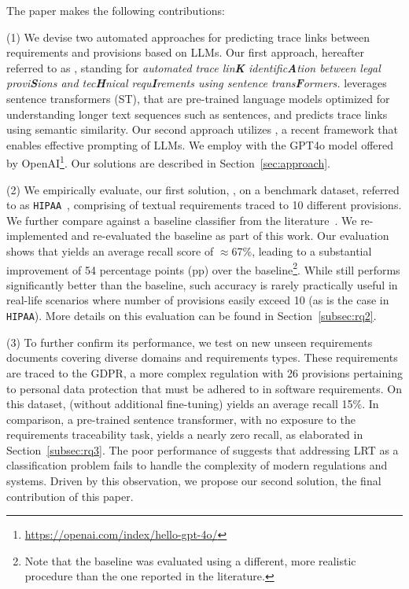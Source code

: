 The paper makes the following contributions: 

(1) We devise two automated approaches for predicting trace links between requirements and provisions based on LLMs. 
Our first approach, hereafter referred to as \kashif, standing for \textit{automated trace lin\textbf{K} identific\textbf{A}tion  between legal provi\textbf{S}ions and tec\textbf{H}nical requ\textbf{I}rements using sentence trans\textbf{F}ormers.} 
\kashif leverages sentence transformers (ST), that are pre-trained language models optimized for understanding longer text sequences such as sentences, and predicts trace links using semantic similarity. 
Our second approach utilizes \RICE, a recent framework that enables effective prompting of LLMs. We employ \RICE with the GPT4o model offered by OpenAI\footnote{\url{https://openai.com/index/hello-gpt-4o/}}. Our solutions are described in Section~\ref{sec:approach}.
%

(2) We empirically evaluate, our first solution, \kashif, on a benchmark dataset, referred to as \texttt{HIPAA}~\cite{Guo:17}, comprising of textual requirements  traced to 10 different provisions. 
We further compare \kashif against a baseline classifier from the literature~\cite{cleland:2010,Guo:17}. %
We re-implemented and re-evaluated the baseline as part of this work. 
Our evaluation shows that \kashif yields an  average recall score of $\approx$67\%, leading to a substantial improvement of 54 percentage points (pp) over the baseline\footnote{Note that the baseline was evaluated using a different, more realistic procedure than the one reported in the literature.}. While \kashif still performs significantly better than the baseline, such accuracy is rarely practically useful in real-life scenarios where number of provisions easily exceed 10 (as is the case in \texttt{HIPAA}). More details on this evaluation can be found in Section~\ref{subsec:rq2}.


(3) To further confirm its performance, we test \kashif on new unseen requirements documents covering diverse domains and requirements types. These requirements are traced to the GDPR, a more complex regulation with 26 provisions pertaining to personal data protection that must be adhered to in software requirements.  
On this dataset, \kashif (without additional fine-tuning) yields an average recall 15\%. In comparison, a pre-trained sentence transformer, with no exposure to the requirements traceability task, yields a nearly zero recall, as elaborated in Section~\ref{subsec:rq3}. %
The poor performance of \kashif  suggests that addressing LRT as a classification problem fails to handle the complexity of modern regulations and systems. Driven by this observation, we propose our second solution, the final contribution of this paper. 


